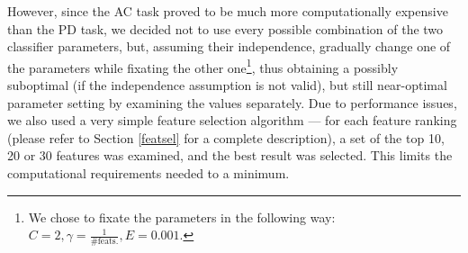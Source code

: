 \documentclass[12pt,notitlepage]{report}
\begin{document}
However, since the AC task proved to be much more computationally expensive than the PD task, we decided not to use every possible combination of the two classifier parameters, but, assuming their independence, gradually change one of the parameters while fixating the other one\footnote{We chose to fixate the parameters in the following way: $C = 2, \gamma = \frac{1}{\mbox{\#feats.}}, E = 0.001$.}, thus obtaining a possibly suboptimal (if the independence assumption is not valid), but still near-optimal parameter setting by examining the values separately. Due to performance issues, we also used a very simple feature selection algorithm --- for each feature ranking (please refer to Section \ref{featsel} for a complete description), a set of the top 10, 20 or 30 features was examined, and the best result was selected. This limits the computational requirements needed to a minimum.
\end{document}
